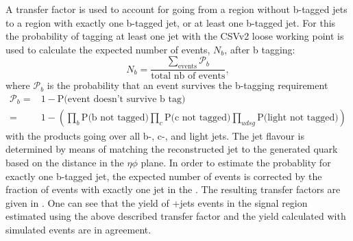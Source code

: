 A transfer factor is used to account for going from a region without b-tagged jets to a region with exactly one b-tagged jet, or at least one b-tagged jet. For this the probability of tagging at least one jet with the CSVv2 loose working point is used to calculate the expected number of events, $N_b$, after b tagging: 
\begin{equation}
	N_b = \frac{\sum \limits_{\mathrm{events}}\mathcal{P}_b}{\text{total nb of events}},
\end{equation}
where $\mathcal{P}_b$ is the probability that an event survives the b-tagging requirement
\begin{equation}
\begin{aligned}
	\mathcal{P}_b =& 1 - \text{P(event doesn't survive b tag)}\\
	 =& 1 - \left(\prod_{b} \text{P(b not tagged)} \prod_{c} \text{P(c not tagged)} \prod_{udsg} \text{P(light not tagged)}\right)
\end{aligned}
\end{equation}
with the products going over all b-, c-, and light jets. The jet flavour is determined by means of matching the reconstructed jet to the generated quark based on the distance in the $\eta\phi$ plane. In order to estimate the probablity for exactly one b-tagged jet, the expected number of events is corrected by the fraction of events with exactly  one jet in the \WZCR. The resulting transfer factors are given in  . One can see  that the yield of \WZ+jets events in the signal region estimated using the above described transfer factor and the yield calculated with simulated events are in agreement. 

